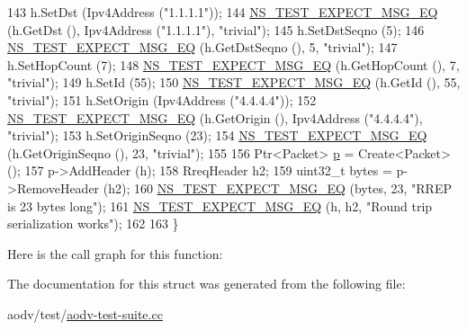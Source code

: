 \begin{DoxyCode}
143     h.SetDst (Ipv4Address (\textcolor{stringliteral}{"1.1.1.1"}));
144     \hyperlink{group__testing_ga7304ba46a28d8cf08dfdfd6499cf7068}{NS\_TEST\_EXPECT\_MSG\_EQ} (h.GetDst (), Ipv4Address (\textcolor{stringliteral}{"1.1.1.1"}), \textcolor{stringliteral}{"trivial"});
145     h.SetDstSeqno (5);
146     \hyperlink{group__testing_ga7304ba46a28d8cf08dfdfd6499cf7068}{NS\_TEST\_EXPECT\_MSG\_EQ} (h.GetDstSeqno (), 5, \textcolor{stringliteral}{"trivial"});
147     h.SetHopCount (7);
148     \hyperlink{group__testing_ga7304ba46a28d8cf08dfdfd6499cf7068}{NS\_TEST\_EXPECT\_MSG\_EQ} (h.GetHopCount (), 7, \textcolor{stringliteral}{"trivial"});
149     h.SetId (55);
150     \hyperlink{group__testing_ga7304ba46a28d8cf08dfdfd6499cf7068}{NS\_TEST\_EXPECT\_MSG\_EQ} (h.GetId (), 55, \textcolor{stringliteral}{"trivial"});
151     h.SetOrigin (Ipv4Address (\textcolor{stringliteral}{"4.4.4.4"}));
152     \hyperlink{group__testing_ga7304ba46a28d8cf08dfdfd6499cf7068}{NS\_TEST\_EXPECT\_MSG\_EQ} (h.GetOrigin (), Ipv4Address (\textcolor{stringliteral}{"4.4.4.4"}), \textcolor{stringliteral}{"trivial"});
153     h.SetOriginSeqno (23);
154     \hyperlink{group__testing_ga7304ba46a28d8cf08dfdfd6499cf7068}{NS\_TEST\_EXPECT\_MSG\_EQ} (h.GetOriginSeqno (), 23, \textcolor{stringliteral}{"trivial"});
155 
156     Ptr<Packet> \hyperlink{lte__link__budget_8m_ac9de518908a968428863f829398a4e62}{p} = Create<Packet> ();
157     p->AddHeader (h);
158     RreqHeader h2;
159     uint32\_t bytes = p->RemoveHeader (h2);
160     \hyperlink{group__testing_ga7304ba46a28d8cf08dfdfd6499cf7068}{NS\_TEST\_EXPECT\_MSG\_EQ} (bytes, 23, \textcolor{stringliteral}{"RREP is 23 bytes long"});
161     \hyperlink{group__testing_ga7304ba46a28d8cf08dfdfd6499cf7068}{NS\_TEST\_EXPECT\_MSG\_EQ} (h, h2, \textcolor{stringliteral}{"Round trip serialization works"});
162 
163   \}
\end{DoxyCode}


Here is the call graph for this function\+:




The documentation for this struct was generated from the following file\+:\begin{DoxyCompactItemize}
\item 
aodv/test/\hyperlink{aodv-test-suite_8cc}{aodv-\/test-\/suite.\+cc}\end{DoxyCompactItemize}
